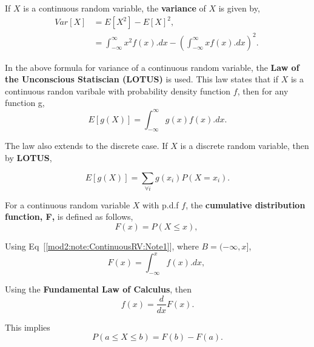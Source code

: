 \begin{defn} \label{mod2:defn:ContinuousRV:Variance}
	If $X$ is a continuous random variable, the \textbf{variance} of $X$ is given by,
	\begin{align}
	Var[X] &= E[X^2] - {E[X]}^2, \\
	 &= \int_{-\infty}^{\infty}x^2 f(x).dx - {(\int_{-\infty}^{\infty}x f(x).dx)} ^ 2. \label{mod2:eq:ContinuousRV:Variance} \
	\end{align}
\end{defn}

\begin{law} \label{mod2:law:UnconsciousStat}
	In the above formula for variance of a continuous random variable,  the \textbf{Law of the Unconscious Statiscian (LOTUS)} is used. This law states that if $X$ is a continuous randon varibale with probability density function $f$, then for any function g,
	\begin{equation}
		E[g(X)] = \int_{-\infty}^{\infty}g(x) f(x).dx. \label{mod2:eq:LOTUS:ContinuousRV}
	\end{equation}
	
	The law also extends to the discrete case. If $X$ is a discrete random variable, then by \textbf{LOTUS}, 
	
	\begin{equation}
	E[g(X)] =  \sum_{\forall i} g(x_i) P(X=x_i). \label{mod2:eq:LOTUS:DiscreteRV}
	\end{equation}
\end{law}	


\begin{defn} \label{mod2:defn:ContinuousRV:CDF}
	For a continuous random variable $X$ with p.d.f $f$,  the \textbf{cumulative distribution function, F,} is defined as follows,
	\begin{equation}
		F(x) = P(X \leq x), \
	\end{equation}
	
	Using Eq~[\ref{mod2:note:ContinuousRV:Note1}], where $B = (-\infty, x]$,
	\begin{equation}
		F(x) = \int_{-\infty}^{x} f(x).dx, \
	\end{equation}
	
	Using the \textbf{Fundamental Law of Calculus}, then
	\begin{equation}
	f(x) = \frac{d}{dx}F(x)
.	\end{equation}
	
	
\end{defn}	

\begin{note} \label{mod2:note:ContinuousRV:CDF}
	This implies
	\begin{equation}
		P( a \leq X \leq b) = F(b) - F(a).
	\end{equation}
\end{note}

